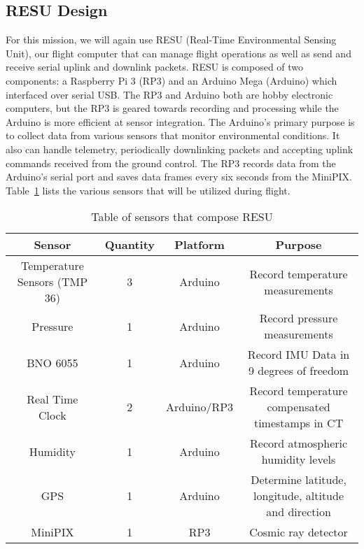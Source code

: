 \subsection{RESU Design}
\label{sec:RESU-Design}

For this mission, we will again use RESU (Real-Time Environmental Sensing Unit), our flight computer that can manage flight operations as well as send and receive serial uplink and downlink packets. RESU is composed of two components: a Raspberry Pi 3 (RP3) and an Arduino Mega (Arduino) which interfaced over serial USB.  The RP3 and Arduino both are hobby electronic computers, but the RP3 is geared towards recording and processing while the Arduino is more efficient at sensor integration.  The Arduino's primary purpose is to collect data from various sensors that monitor environmental conditions. It also can handle telemetry, periodically downlinking packets and accepting uplink commands received from the ground control. The RP3 records data from the Arduino's serial port and saves data frames every six seconds from the MiniPIX.  Table~\ref{tab:Sensors} lists the various sensors that will be utilized during flight.

\begin{table}[h!]
\centering
\caption{Table of sensors that compose RESU}
\label{tab:Sensors}
\bigskip
\begin{tabular}{|c|c|c|c|}
\hline
\multicolumn{1}{|c|}{\bfseries Sensor} & {\bfseries Quantity} & {\bfseries Platform} & {\bfseries Purpose} \\
\hline
    Temperature Sensors (TMP 36)	& 3 & Arduino  		& Record temperature measurements  \\ \hline
    Pressure        				& 1 & Arduino 		& Record pressure measurements \\ \hline
    BNO 6055       					& 1 & Arduino 		& Record IMU Data in 9 degrees of freedom \\ \hline    
    Real Time Clock 				& 2 & Arduino/RP3 	& Record temperature compensated timestamps in CT \\\hline
    Humidity        				& 1 & Arduino 		& Record atmospheric humidity levels \\ \hline
    GPS     						& 1 & Arduino 		& Determine latitude, longitude, altitude and direction \\ \hline
    MiniPIX         				& 1 & RP3     		& Cosmic ray detector \\ \hline
\end{tabular}
\end{table}

